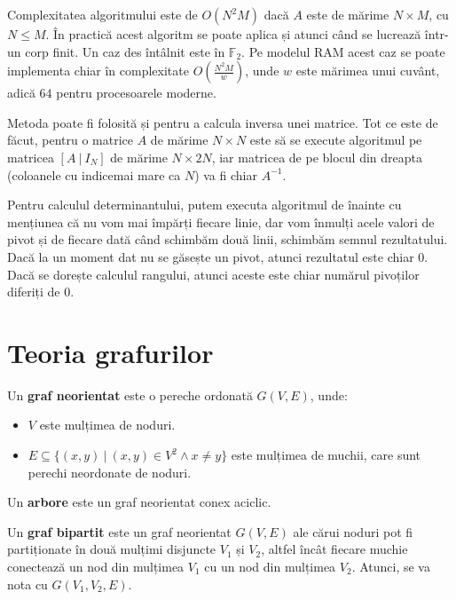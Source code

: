Complexitatea algoritmului este de $O(N^{2}M)$ dacă $A$ este de mărime $N \times M$, cu $N \leq M$.
În practică acest algoritm se poate aplica și atunci când se lucrează într-un corp finit.
Un caz des întâlnit este în $\mathbb{F}_{2}$. Pe modelul RAM acest caz se poate implementa chiar în
complexitate $O(\frac{N^{2}M}{w})$, unde $w$ este mărimea unui cuvânt, adică $64$ pentru procesoarele
moderne.

Metoda poate fi folosită și pentru a calcula inversa unei matrice. Tot ce este de făcut, pentru o matrice
$A$ de mărime $N \times N$ este să se execute algoritmul pe matricea $[A\ |\ I_{N}]$ de mărime $N \times 2N$,
iar matricea de pe blocul din dreapta (coloanele  cu indicemai mare ca $N$) va fi chiar $A^{-1}$.

Pentru calculul determinantului, putem executa algoritmul de înainte cu mențiunea că nu vom mai împărți fiecare
linie, dar vom înmulți acele valori de pivot și de fiecare dată când schimbăm două linii, schimbăm semnul
rezultatului. Dacă la un moment dat nu se găsește un pivot, atunci rezultatul este chiar $0$. Dacă se
dorește calculul rangului, atunci aceste este chiar numărul pivoților diferiți de $0$.

\pagebreak

\section{Teoria grafurilor}

\begin{defn}
  Un \textbf{graf neorientat} este o pereche ordonată $G(V, E)$, unde:
  \begin{itemize}
    \item{$V$ este mulțimea de noduri}.
    \item{$E \subseteq \{(x, y)\ |\ (x, y) \in V^2 \land x \neq y\}$ este
      mulțimea de muchii, care sunt perechi neordonate de noduri}.
  \end{itemize}
\end{defn}

\begin{defn}
  Un \textbf{arbore} este un graf neorientat conex aciclic.
\end{defn}

\begin{defn}
  Un \textbf{graf bipartit} este un graf neorientat $G(V, E)$ ale cărui noduri pot fi
  partiționate în două mulțimi disjuncte $V_{1}$ și $V_{2}$, altfel încât fiecare muchie
  conectează un nod din mulțimea $V_{1}$ cu un nod din mulțimea $V_{2}$. Atunci,
  se va nota cu $G(V_{1}, V_{2}, E)$.
\end{defn}

